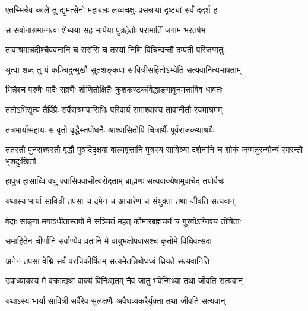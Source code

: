 \begin{center}

\twolineshloka
{एतस्मिन्नेव काले तु द्युमत्सेनो महाबलः}
{लब्धचक्षुः प्रसन्नायां दृष्ट्यां सर्वं ददर्श ह}


\twolineshloka
{स सर्वानाश्रमान्गत्वा शैब्यया सह भार्यया}
{पुत्रहेतोः परामार्तिं जगाम भरतर्षभ}


\twolineshloka
{तावाश्रमान्नदीश्चैववनानि च सरांसि च}
{तस्यां निशि विचिन्वन्तौ दम्पती परिजग्मतुः}


\twolineshloka
{श्रुत्वा शब्दं तु यं कञ्चिदुन्मुखौ सुतशङ्कया}
{सावित्रीसहितोऽभ्येति सत्यवानित्यभाषताम्}


\twolineshloka
{भिन्नैश्च परुषैः पादैः सव्रणैः शोणितोक्षितैः}
{कुशकण्टकविद्धाङ्गावुनमत्ताविव धावतः}


\twolineshloka
{ततोऽभिसृत्य तैर्विप्रैः सर्वैराश्रमवासिभिः}
{परिवार्य समाश्वास्य तावानीतौ स्वमाश्रमम्}


\twolineshloka
{तत्रभार्यासहायः स वृतो वृद्धैस्तपोधनैः}
{आश्वासितोपि चित्रार्थैः पूर्वराजकथाश्रयैः}


\threelineshloka
{ततस्तौ पुनराश्वस्तौ वृद्धौ पुत्रदिदृक्षया}
{बाल्यवृत्तानि पुत्रस्य सावित्र्या दर्शनानि च}
{शोकं जग्मतुरन्योन्यं स्मरन्तौ भृशदुःखितौ}


\twolineshloka
{हापुत्र हासाध्वि वधु क्वासिक्वासीत्यरोदताम्}
{ब्राह्मणः सत्यवाक्येषामुवाचेदं तयोर्वचः}




\twolineshloka
{यथास्य भार्या सावित्री तपसा च दमेन च}
{आचारेण च संयुक्ता तथा जीवति सत्यवान्}




\twolineshloka
{वेदाः साङ्गा मयाऽधीतास्तपो मे सञ्चितं महत्}
{कौमारब्रह्मचर्यं च गुरवोऽग्निश्च तोषिताः}


\twolineshloka
{समाहितेन चीर्णानि सर्वाण्येव व्रतानि मे}
{वायुभक्षोपवासश्च कृतोमे विधिवत्सदा}


\twolineshloka
{अनेन तपसा वेद्मि सर्वं परचिकीर्षितम्}
{सत्यमेतन्निबोधध्वं ध्रियते सत्यवानिति}




\twolineshloka
{उपाध्यायस्य मे वक्राद्यथा वाक्यं विनिःसृतम्}
{नैव जातु भवेन्मिथ्या तथा जीवति सत्यवान्}




\twolineshloka
{यथाऽस्य भार्या सावित्री सर्वैरेव सुलक्षणैः}
{अवैधव्यकरैर्युक्ता तथा जीवति सत्यवान्}


\end{center}
